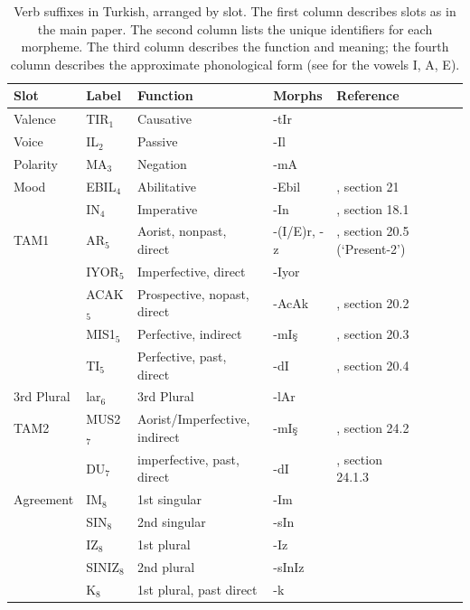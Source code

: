 \documentclass[11pt,letterpaper]{article}
\begin{document}
\begin{table}
\begin{tabular}{llllllll}
Slot & Label & Function & Morphs & Reference \\ \hline
\hline
	Valence & TIR$_1$  & Causative & -tIr & \\
\hline
	Voice &  IL$_2$ & Passive & -Il\\
\hline
Polarity  & MA$_3$ & Negation & -mA \\
\hline
Mood  & EBIL$_4$ & Abilitative & -Ebil & \cite{schaaik2020turkish}, section 21 \\
      & IN$_4$   & Imperative & -In & \cite{schaaik2020turkish}, section 18.1 \\
\hline
TAM1      & AR$_5$ & Aorist, nonpast, direct & -(I/E)r, -z  & \cite{schaaik2020turkish}, section 20.5 (`Present-2') \\
          & IYOR$_5$ & Imperfective, direct & -Iyor \\
          & ACAK$_5$ & Prospective, nopast, direct & -AcAk & \cite{schaaik2020turkish}, section 20.2\\
          & MIS1$_5$  & Perfective, indirect & -mIş & \cite{schaaik2020turkish}, section 20.3\\
          & TI$_5$ & Perfective, past, direct & -dI & \cite{schaaik2020turkish}, section 20.4\\
\hline
	3rd Plural& lar$_{6}$  & 3rd Plural & -lAr & \\
\hline
TAM2      & MUS2$_7$ & Aorist/Imperfective, indirect & -mIş & \cite{schaaik2020turkish}, section 24.2 \\
          & DU$_7$ & imperfective, past, direct & -dI & \cite{schaaik2020turkish}, section 24.1.3 \\
\hline
	Agreement & IM$_8$ & 1st singular & -Im\\
	  & SIN$_8$ &2nd singular & -sIn\\
	  & IZ$_8$  & 1st plural & -Iz\\
	  & SINIZ$_8$ & 2nd plural & -sInIz \\
	  & K$_8$     & 1st plural, past direct & -k\\
\hline
\end{tabular}
	\caption{Verb suffixes in Turkish, arranged by slot. The first column describes slots as in the main paper. The second column lists the unique identifiers for each morpheme. The third column describes the function and meaning; the fourth column describes the approximate phonological form (see \citet[Section 5.1]{schaaik2020turkish} for the vowels I, A, E).}\label{tab:turkish-suffixes}
\end{table}
\end{document}
